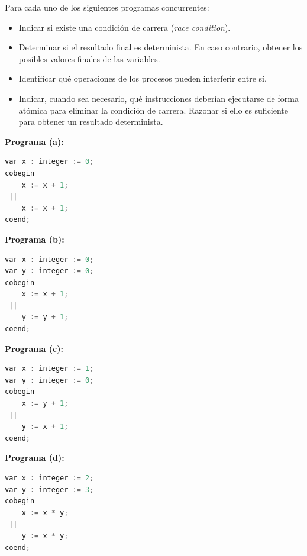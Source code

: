 \begin{ejercicio}
Para cada uno de los siguientes programas concurrentes:
\begin{itemize}[leftmargin=*]
    \item Indicar si existe una condición de carrera (\textit{race condition}).
    \item Determinar si el resultado final es determinista. En caso contrario, obtener los posibles valores finales de las variables.
    \item Identificar qué operaciones de los procesos pueden interferir entre sí.
    \item Indicar, cuando sea necesario, qué instrucciones deberían ejecutarse de forma atómica para eliminar la condición de carrera. Razonar si ello es suficiente para obtener un resultado determinista.
\end{itemize}

\begin{minipage}{0.48\textwidth}
\textbf{Programa (a):}
\begin{lstlisting}[language=C++]
var x : integer := 0;
cobegin
    x := x + 1;
 ||
    x := x + 1;
coend;
\end{lstlisting}
\end{minipage}\hfill
\begin{minipage}{0.48\textwidth}
\textbf{Programa (b):}
\begin{lstlisting}[language=C++]
var x : integer := 0;
var y : integer := 0;
cobegin
    x := x + 1;
 ||
    y := y + 1;
coend;
\end{lstlisting}
\end{minipage}

\vspace{10pt}
\begin{minipage}{0.48\textwidth}
\textbf{Programa (c):}
\begin{lstlisting}[language=C++]
var x : integer := 1;
var y : integer := 0;
cobegin
    x := y + 1;
 ||
    y := x + 1;
coend;
\end{lstlisting}
\end{minipage}\hfill
\begin{minipage}{0.48\textwidth}
\textbf{Programa (d):}
\begin{lstlisting}[language=C++]
var x : integer := 2;
var y : integer := 3;
cobegin
    x := x * y;
 ||
    y := x * y;
coend;
\end{lstlisting}
\end{minipage}
\end{ejercicio}

